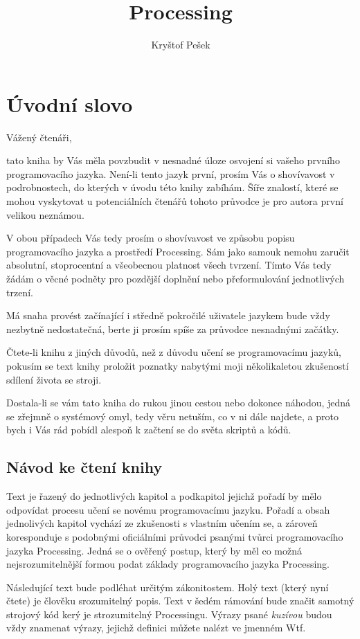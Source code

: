\documentclass[11pt]{article}
\title{Processing}
\author{Kryštof Pešek}
\date{} %
\begin{document}
\section{Úvodní slovo}

Vážený čtenáři,

tato kniha by Vás měla povzbudit v nesnadné úloze osvojení si vašeho prvního programovacího jazyka. Není-li tento jazyk první, prosím Vás o shovívavost v podrobnostech, do kterých v úvodu této knihy zabíhám. Šíře znalostí, které se mohou vyskytovat u potenciálních čtenářů tohoto průvodce je pro autora první velikou neznámou.

V obou případech Vás tedy prosím o shovívavost ve způsobu popisu programovacího jazyka a prostředí Processing. Sám jako samouk nemohu zaručit absolutní, stoprocentní a všeobecnou platnost všech tvrzení. Tímto Vás tedy žádám o věcné podněty pro pozdější doplnění nebo přeformulování jednotlivých trzení.

Má snaha provést začínající i středně pokročilé uživatele jazykem bude vždy nezbytně nedostatečná, berte ji prosím spíše za průvodce nesnadnými začátky.

Čtete-li knihu z jiných důvodů, než z důvodu učení se programovacímu jazyků, pokusím se text knihy proložit poznatky nabytými moji několikaletou zkušeností sdílení života se stroji.

Dostala-li se vám tato kniha do rukou jinou cestou nebo dokonce náhodou, jedná se zřejmně o systémový omyl, tedy věru netuším, co v ni dále najdete, a proto bych i Vás rád pobídl alespoň k začtení se do světa skriptů a kódů. 


\subsection{Návod ke čtení knihy}

Text je řazený do jednotlivých kapitol a podkapitol jejichž pořadí by mělo odpovídat procesu učení se novému programovacímu jazyku. Pořadí a obsah jednolivých kapitol vychází ze zkušenosti s vlastním učením se, a zároveň koresponduje s podobnými oficiálními průvodci psanými tvůrci programovacího jazyka Processing. Jedná se o ověřený postup, který by měl co možná nejsrozumitelnější formou podat základy programovacího jazyka Processing.

Následující text bude podléhat určitým zákonitostem. Holý text (který nyní čtete) je člověku srozumitelný popis. Text v šedém rámování bude značit samotný strojový kód kerý je strozumitelný Processingu. Výrazy psané {\em kuzívou} budou vždy znamenat výrazy, jejichž definici můžete nalézt ve jmenném  Wtf.
\end{document}
